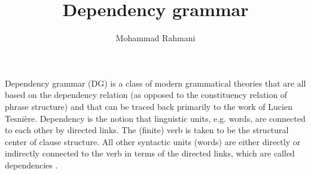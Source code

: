 \documentclass[a4paper]{article}
\title{Dependency grammar}
\date{}
\author{Mohammad Rahmani}
\begin{document}
\maketitle
    Dependency grammar (DG) is a class of modern grammatical theories that are all based on the dependency relation (as opposed to the constituency relation of phrase structure) and that can be traced back primarily to the work of Lucien Tesnière. Dependency is the notion that linguistic units, e.g. words, are connected to each other by directed links. The (finite) verb is taken to be the structural center of clause structure. All other syntactic units (words) are either directly or indirectly connected to the verb in terms of the directed links, which are called dependencies .
    
    
\end{document}
